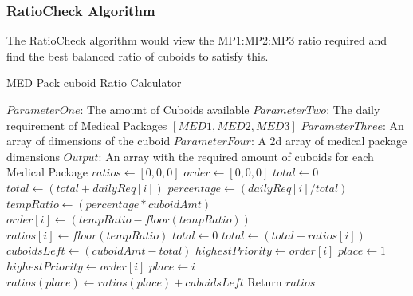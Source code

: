 \documentclass[a4paper,12pt]{article}
\begin{document}
\subsubsection{RatioCheck Algorithm}
The RatioCheck algorithm would view the MP1:MP2:MP3 ratio required and find the best balanced ratio of cuboids to satisfy this.

	\begin{algorithm}
	    \caption{MED Pack cuboid Ratio Calculator}
		\begin{algorithmic}[1]
			\State $ParameterOne$: The amount of Cuboids available
			\State $ParameterTwo$: The daily requirement of Medical Packages $[MED 1,MED 2,MED 3]$
			\State $ParameterThree$: An array of dimensions of the cuboid
			\State $ParameterFour$: A 2d array of medical package dimensions
			\State $Output$: An array with the required amount of cuboids for each Medical Package
			\State
			\State $ratios \leftarrow [0,0,0]$
			\State $order \leftarrow  [0,0,0]$
			\State
			\State $total \leftarrow 0$
			\State $total \leftarrow (total + dailyReq[i])$
			\EndFor
			\State
			\State $percentage \leftarrow (dailyReq[i]/total)$
			\State $tempRatio \leftarrow (percentage * cuboidAmt)$
			\State $order[i] \leftarrow (tempRatio - floor(tempRatio))$ 
			\State $ratios[i] \leftarrow floor(tempRatio) $
			\EndFor
			\State
			\State $total \leftarrow 0$
			\State $total \leftarrow (total + ratios[i])$
			\EndFor
			\State
			\State $cuboidsLeft \leftarrow (cuboidAmt - total)$
			\State $highestPriority \leftarrow order[i]$
			\State $place \leftarrow 1$
			 
			\State $highestPriority \leftarrow order[i]$
			\State $place \leftarrow i$
			\EndIf
			\EndFor
			\State
			\State $ratios(place) \leftarrow ratios(place) + cuboidsLeft$ 
			\State Return $ratios$
			\EndProcedure
		\end{algorithmic}
	\end{algorithm}

\newpage
\end{document}
